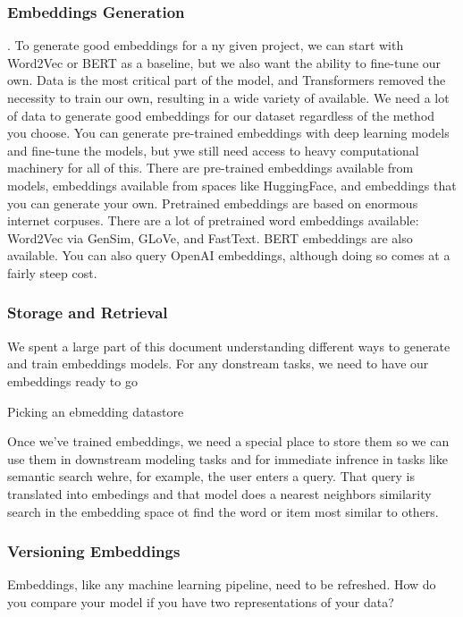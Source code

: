 \documentclass[11pt, table]{diazessay} %
\begin{document}
\begin{sloppypar}
\subsubsection*{Embeddings Generation}

. To generate good embeddings for a ny given project, we can start with Word2Vec or BERT as a baseline, but we also want the ability to fine-tune our own. Data is the most critical part of the model, and Transformers removed the necessity to train our own, resulting in a wide variety of available. We need a lot of data to generate good embeddings for our dataset regardless of the method you choose. You can generate pre-trained embeddings with deep learning models and fine-tune the models, but ywe still need access to heavy computational machinery for all of this.  There are pre-trained embeddings available from models, embeddings available from spaces like HuggingFace, and embeddings that you can generate your own.  Pretrained embeddings are based on enormous internet corpuses.  There are a lot of pretrained word embeddings available: Word2Vec via GenSim, GLoVe, and FastText. BERT embeddings are also available.  You can also query OpenAI embeddings, although doing so comes at a fairly steep cost.

\subsubsection*{Storage and Retrieval }
 We spent a large part of this document understanding different ways to generate and train embeddings models. For any donstream tasks, we need to have our embeddings ready to go

 Picking an ebmedding datastore 




Once we've trained embeddings, we need a special place to store them so we can use them in downstream modeling tasks and for immediate infrence in tasks like semantic search wehre, for example, the user enters a query. That query is translated into embedings and that model does a nearest neighbors similarity search in the embedding space ot find the word or item most similar to others. 

\subsubsection*{Versioning Embeddings}

Embeddings, like any machine learning pipeline, need to be refreshed. How do you compare your model if you have two representations of your data? 



\end{sloppypar}
\end{document}
